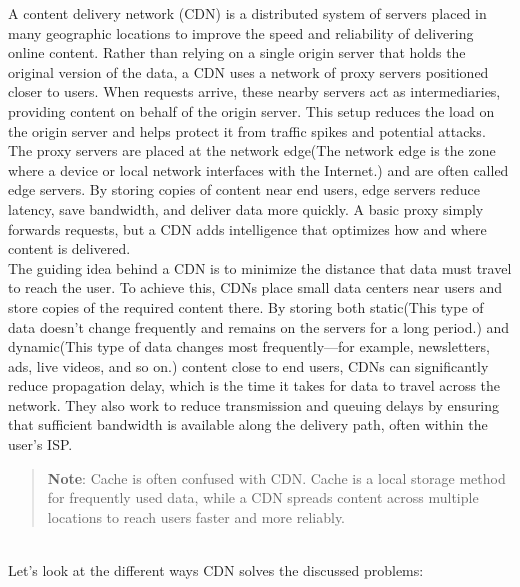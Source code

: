 

A content delivery network (CDN) is a distributed system of servers placed in many geographic locations to improve the speed and reliability of delivering online content. Rather than relying on a single origin server that holds the original version of the data, a CDN uses a network of proxy servers positioned closer to users. When requests arrive, these nearby servers act as intermediaries, providing content on behalf of the origin server. This setup reduces the load on the origin server and helps protect it from traffic spikes and potential attacks.
\\
The proxy servers are placed at the network edge(The network edge is the zone where a device or local network interfaces with the Internet.) and are often called edge servers. By storing copies of content near end users, edge servers reduce latency, save bandwidth, and deliver data more quickly. A basic proxy simply forwards requests, but a CDN adds intelligence that optimizes how and where content is delivered.
\\
The guiding idea behind a CDN is to minimize the distance that data must travel to reach the user. To achieve this, CDNs place small data centers near users and store copies of the required content there. By storing both static(This type of data doesn't change frequently and remains on the servers for a long period.) and dynamic(This type of data changes most frequently---for example, newsletters, ads, live videos, and so on.) content close to end users, CDNs can significantly reduce propagation delay, which is the time it takes for data to travel across the network. They also work to reduce transmission and queuing delays by ensuring that sufficient bandwidth is available along the delivery path, often within the user's ISP.
\begin{quote}
\textbf{Note}: Cache is often confused with CDN. Cache is a local storage method for frequently used data, while a CDN spreads content across multiple locations to reach users faster and more reliably.
\end{quote}
\\
Let's look at the different ways CDN solves the discussed problems:

